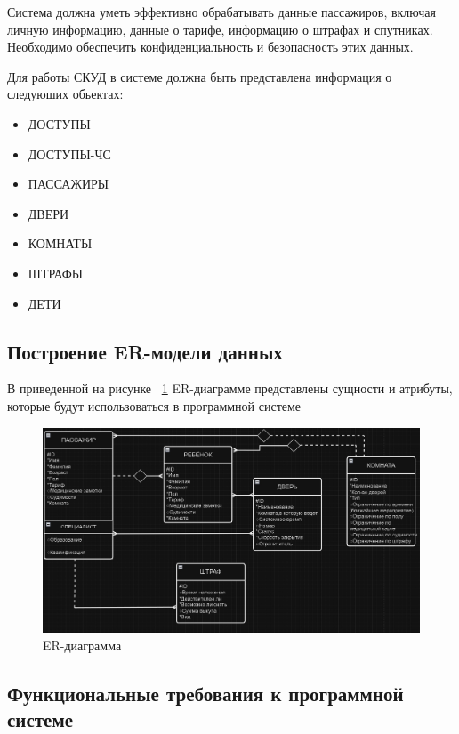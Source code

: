 Система должна уметь эффективно обрабатывать данные пассажиров, включая личную информацию, данные о тарифе, информацию о штрафах и спутниках. Необходимо обеспечить конфиденциальность и безопасность этих данных.

Для работы СКУД в системе должна быть представлена информация о следуюших обьектах:

\begin{itemize}
	\item ДОСТУПЫ
	\item ДОСТУПЫ-ЧС
	\item ПАССАЖИРЫ
	\item ДВЕРИ
	\item КОМНАТЫ
	\item ШТРАФЫ
	\item ДЕТИ
\end{itemize}


\subsection{Построение ER-модели данных}

В приведенной на рисунке ~\ref{fig:er} ER-диаграмме представлены сущности и атрибуты, которые будут использоваться в программной системе 

\begin{figure}[ht]
	\centering
	\includegraphics[width=1\linewidth]{images/ER}
	\caption{ER-диаграмма}
	\label{fig:er}
\end{figure}

\subsection{Функциональные требования к программной системе}

